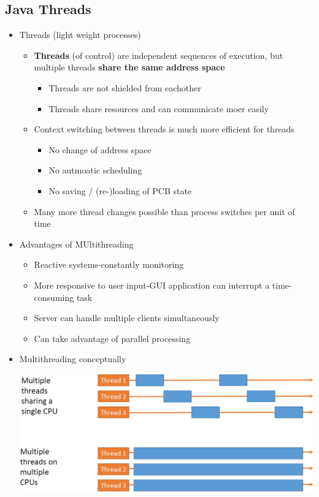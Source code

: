 \documentclass[a4paper]{article}
\begin{document}
\subsection*{Java Threads}
	\begin{itemize}
		\item Threads (light weight processes)
			\begin{itemize}
				\item \textbf{Threads} (of control) are independent sequences of execution, but multiple threads \textbf{share the same address space}
					\begin{itemize}
						\item Threads are not shielded from eachother
						\item Threads share resources and can communicate moer easily
					\end{itemize}
				\item Context switching between threads is much more efficient for threads
					\begin{itemize}
						\item No change of address space
						\item No autmoatic scheduling
						\item No saving / (re-)loading of PCB state
					\end{itemize}
				\item Many more thread changes possible than process switches per unit of time
			\end{itemize}
		\item Advantages of MUltithreading
			\begin{itemize}
				\item Reactive systems-constantly monitoring
				\item More responsive to user input-GUI application can interrupt a time-consuming task
				\item Server can handle multiple clients simultaneously
				\item Can take advantage of parallel processing
			\end{itemize}
		\item Multithreading conceptually\\
			\begin{center}
				\includegraphics[scale=1]{Figures/MultithreadingConceptually.jpg}

\end{center}
\end{itemize}
\end{document}
